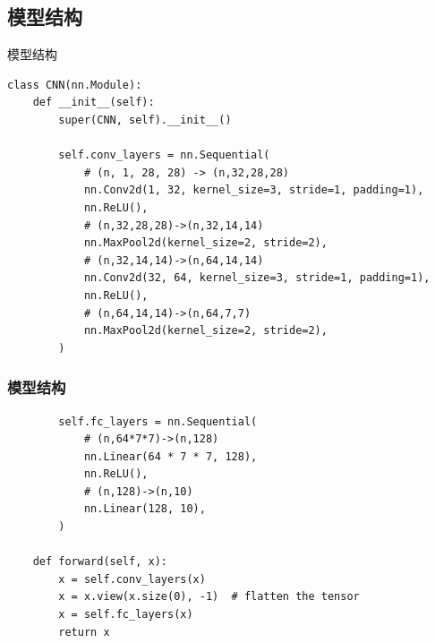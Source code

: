 \documentclass{beamer}
\begin{document}
\subsection{模型结构}
\begin{frame}[fragile]{模型结构}
	\begin{verbatim}
class CNN(nn.Module):
    def __init__(self):
        super(CNN, self).__init__()

        self.conv_layers = nn.Sequential(
            # (n, 1, 28, 28) -> (n,32,28,28)
            nn.Conv2d(1, 32, kernel_size=3, stride=1, padding=1),
            nn.ReLU(),
            # (n,32,28,28)->(n,32,14,14)
            nn.MaxPool2d(kernel_size=2, stride=2),
            # (n,32,14,14)->(n,64,14,14)
            nn.Conv2d(32, 64, kernel_size=3, stride=1, padding=1),
            nn.ReLU(),
            # (n,64,14,14)->(n,64,7,7)
            nn.MaxPool2d(kernel_size=2, stride=2),
        )
	\end{verbatim}

\end{frame}
\begin{frame}[fragile]
	\frametitle{模型结构}

	\begin{verbatim}
        self.fc_layers = nn.Sequential(
            # (n,64*7*7)->(n,128)
            nn.Linear(64 * 7 * 7, 128),
            nn.ReLU(),
            # (n,128)->(n,10)
            nn.Linear(128, 10),
        )

    def forward(self, x):
        x = self.conv_layers(x)
        x = x.view(x.size(0), -1)  # flatten the tensor
        x = self.fc_layers(x)
        return x
	\end{verbatim}

\end{frame}
\end{document}
